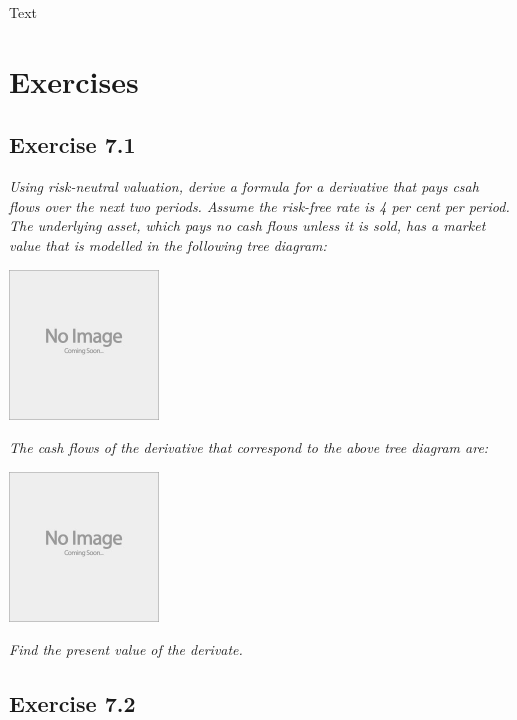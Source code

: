 \documentclass[]{book}
\theoremstyle{definition}
\theoremstyle{definition}
\theoremstyle{remark}
\begin{document}
Text

\section{Exercises}\label{exercises-6}

\subsection{Exercise 7.1}\label{exercise-7.1}

\emph{Using risk-neutral valuation, derive a formula for a derivative
that pays csah flows over the next two periods. Assume the risk-free
rate is 4 per cent per period.} \citep[p.233]{book} \emph{The underlying
asset, which pays no cash flows unless it is sold, has a market value
that is modelled in the following tree diagram:} \citep[p.233]{book}

\begin{center}\includegraphics[width=150px]{figures/placeholder} \end{center}

\emph{The cash flows of the derivative that correspond to the above tree
diagram are:} \citep[p.233]{book}

\begin{center}\includegraphics[width=150px]{figures/placeholder} \end{center}

\emph{Find the present value of the derivate.} \citep[p.233]{book}

\subsection{Exercise 7.2}\label{exercise-7.2}
\end{document}
